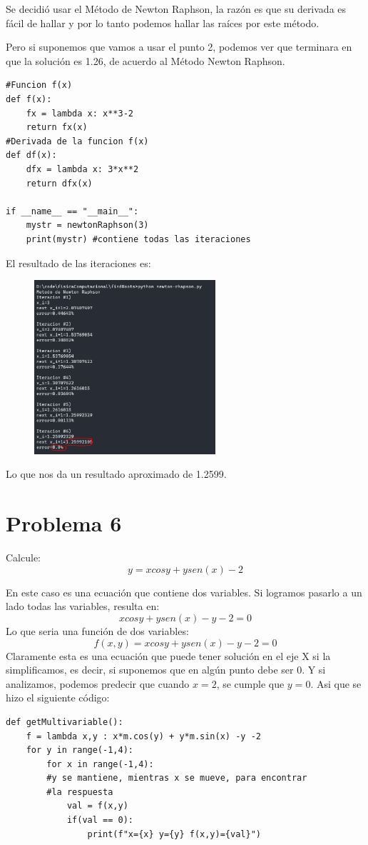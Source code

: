 \documentclass[a4paper,12pt]{article}
\newcommand{\eq}[1]{$#1$}
\begin{document}
    Se decidió usar 
    el Método de Newton Raphson, la razón es que su derivada es fácil 
    de hallar y por lo tanto
    podemos hallar las raíces por este método.

    Pero si suponemos que vamos a usar el punto 2, podemos ver que terminara en 
    que la solución es 1.26, de acuerdo al Método Newton Raphson.


\begin{lstlisting}
#Funcion f(x)
def f(x):
    fx = lambda x: x**3-2
    return fx(x)
#Derivada de la funcion f(x)
def df(x):
    dfx = lambda x: 3*x**2
    return dfx(x)

if __name__ == "__main__":
    mystr = newtonRaphson(3)
    print(mystr) #contiene todas las iteraciones
\end{lstlisting}
El resultado de las iteraciones es:
\newpage
    \begin{figure}[t]
        \centering
        \includegraphics[width=0.6\textwidth]{f5console.PNG}
    \end{figure}

Lo que nos da un resultado aproximado de 1.2599.

    \section{Problema 6}
    Calcule:
    \begin{equation}
        y = xcosy + ysen(x) - 2
    \end{equation}
    
    En este caso es una ecuación que contiene dos variables.
    Si logramos pasarlo a un lado todas las variables, resulta en:
    \[
        xcosy + ysen(x) -y -2 = 0
    \]
    Lo que seria una función de dos variables:
    \[
        f(x,y) = xcosy + ysen(x) -y -2 = 0
    \]
    Claramente esta es una ecuación que puede tener solución
    en el eje X si la simplificamos, es decir, si suponemos que en 
    algún punto debe ser 0.
    Y si analizamos, podemos predecir que cuando 
    \eq{x=2}, se cumple que \eq{y = 0}.
    \clearpage
    Asi que se hizo el siguiente código:
    \begin{lstlisting}
def getMultivariable():
    f = lambda x,y : x*m.cos(y) + y*m.sin(x) -y -2
    for y in range(-1,4):
        for x in range(-1,4):
        #y se mantiene, mientras x se mueve, para encontrar 
        #la respuesta
            val = f(x,y)
            if(val == 0):
                print(f"x={x} y={y} f(x,y)={val}")
    \end{lstlisting}
\end{document}
